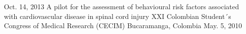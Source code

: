 \begin{cventries}
    {Oct. 14, 2013} %
    {
    }
  \cventry
    {A pilot for the assessment of behavioural risk factors associated with cardiovascular disease in spinal cord injury} %
    {XXI Colombian Student´s Congress of Medical Research (CECIM)} %
    {Bucaramanga, Colombia} %
    {May. 5, 2010} %
    {
    }
\end{cventries}


\begin{refsection}
  \nocite{can2015}
  \nocite{candevbio2016}
  \nocite{uva2016}
  \nocite{sfn2016}
  \nocite{bcregmed2017}
  \nocite{bcregmed2018}
  \nocite{can2018}
  \nocite{sfn2018}
  \nocite{can2019}
	\nocite{igcj2019}
	
		\printbibliography[
		heading=none, 
		sorting=ydnt
		]
\end{refsection}